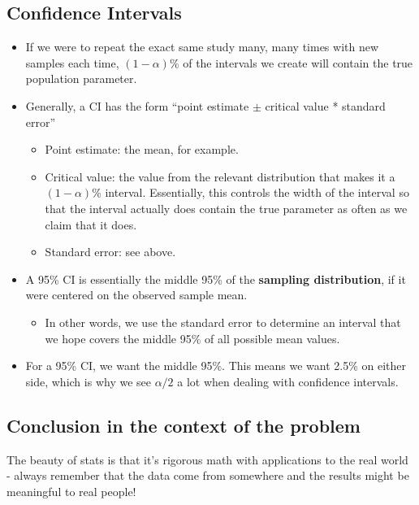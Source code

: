 \documentclass[
  letterpaper,
  DIV=11,
  numbers=noendperiod,
  oneside]{scrreprt}
\providecommand{\tightlist}{%
  \setlength{\itemsep}{0pt}\setlength{\parskip}{0pt}}\usepackage{longtable,booktabs,array}
\begin{document}
\hypertarget{confidence-intervals-4}{%
\subsection{Confidence Intervals}\label{confidence-intervals-4}}

\begin{itemize}
\tightlist
\item
  If we were to repeat the exact same study many, many times with new
  samples each time, \((1-\alpha)\)\% of the intervals we create will
  contain the true population parameter.
\item
  Generally, a CI has the form ``point estimate \(\pm\) critical value *
  standard error''

  \begin{itemize}
  \tightlist
  \item
    Point estimate: the mean, for example.
  \item
    Critical value: the value from the relevant distribution that makes
    it a \((1-\alpha)\)\% interval. Essentially, this controls the width
    of the interval so that the interval actually does contain the true
    parameter as often as we claim that it does.
  \item
    Standard error: see above.
  \end{itemize}
\item
  A 95\% CI is essentially the middle 95\% of the \textbf{sampling
  distribution}, if it were centered on the observed sample mean.

  \begin{itemize}
  \tightlist
  \item
    In other words, we use the standard error to determine an interval
    that we hope covers the middle 95\% of all possible mean values.
  \end{itemize}
\item
  For a 95\% CI, we want the middle 95\%. This means we want 2.5\% on
  either side, which is why we see \(\alpha/2\) a lot when dealing with
  confidence intervals.
\end{itemize}

\hypertarget{conclusion-in-the-context-of-the-problem}{%
\subsection{Conclusion in the context of the
problem}\label{conclusion-in-the-context-of-the-problem}}

The beauty of stats is that it's rigorous math with applications to the
real world - always remember that the data come from somewhere and the
results might be meaningful to real people!
\end{document}
